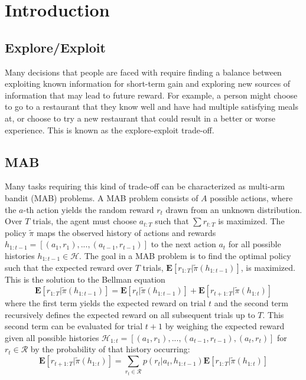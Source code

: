 \documentclass[10pt,letterpaper]{article}
\title{}
\author{}
\begin{document}
	
	\maketitle
	
	
	\begin{abstract}
		
		

		
	\end{abstract}
	
	
	\section{Introduction}
	
	\subsection{Explore/Exploit}
	
	Many decisions that people are faced with require finding a balance between exploiting known information for short-term gain and exploring new sources of information that may lead to future reward. For example, a person might choose to go to a restaurant that they know well and have had multiple satisfying meals at, or choose to try a new restaurant that could result in a better or worse experience. This is known as the explore-exploit trade-off.
	
	\subsection{MAB}
	
	Many tasks requiring this kind of trade-off can be characterized as multi-arm bandit (MAB) problems. A MAB problem consists of $A$ possible actions, where the $a$-th action yields the random reward $r_{t}$ drawn from an unknown distribution. Over $T$ trials, the agent must choose $a_{t:T}$ such that $\sum r_{t:T}$ is maximized. The policy $\tilde{\pi}$ maps the observed history of actions and rewards $h_{1:t-1} = [(a_{1}, r_{1}),...,(a_{t-1}, r_{t-1})]$ to the next action $a_{t}$ for all possible histories $h_{1:t-1} \in \mathcal{H}$. The goal in a MAB problem is to find the optimal policy such that the expected reward over $T$ trials, $\mathbf{E}[r_{1:T} | \tilde{\pi}( h_{1:t-1})]$, is maximized. This is the solution to the Bellman equation
	\begin{equation}
	\mathbf{E}[r_{1:T} | \tilde{\pi}( h_{1:t-1})] = \mathbf{E}[r_{t} | \tilde{\pi}(h_{1:t-1})] + \mathbf{E}[r_{t+1:T} | \tilde{\pi}( h_{1:t})]
	\end{equation}
	where the first term yields the expected reward on trial $t$ and the second term recursively defines the expected reward on all subsequent trials up to $T$. This second term can be evaluated for trial $t+1$ by weighing the expected reward given all possible histories $ \mathcal{ H}_{1:t} = [(a_{1}, r_{1}),...,(a_{t-1},r_{t-1}),(a_{t},r_{t})]$ for $r_{t} \in \mathcal{R}$ by the probability of that history occurring:
	\begin{equation}
	\mathbf{E}[r_{t+1:T} | \tilde{\pi}( h_{1:t})] = \sum_{r_{t} \in \mathcal{R}} p(r_{t} | a_{t}, h_{1:t-1}) \mathbf{E}[r_{1:T} | \tilde{\pi}( h_{1:t})]
	\end{equation}
\end{document}
